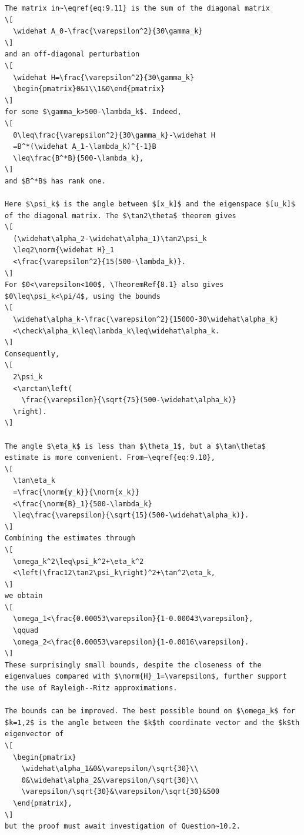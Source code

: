 \begin{verbatim}
The matrix in~\eqref{eq:9.11} is the sum of the diagonal matrix
\[
  \widehat A_0-\frac{\varepsilon^2}{30\gamma_k}
\]
and an off-diagonal perturbation
\[
  \widehat H=\frac{\varepsilon^2}{30\gamma_k}
  \begin{pmatrix}0&1\\1&0\end{pmatrix}
\]
for some $\gamma_k>500-\lambda_k$. Indeed,
\[
  0\leq\frac{\varepsilon^2}{30\gamma_k}-\widehat H
  =B^*(\widehat A_1-\lambda_k)^{-1}B
  \leq\frac{B^*B}{500-\lambda_k},
\]
and $B^*B$ has rank one.

Here $\psi_k$ is the angle between $[x_k]$ and the eigenspace $[u_k]$ of the diagonal matrix. The $\tan2\theta$ theorem gives
\[
  (\widehat\alpha_2-\widehat\alpha_1)\tan2\psi_k
  \leq2\norm{\widehat H}_1
  <\frac{\varepsilon^2}{15(500-\lambda_k)}.
\]
For $0<\varepsilon<100$, \TheoremRef{8.1} also gives $0\leq\psi_k<\pi/4$, using the bounds
\[
  \widehat\alpha_k-\frac{\varepsilon^2}{15000-30\widehat\alpha_k}
  <\check\alpha_k\leq\lambda_k\leq\widehat\alpha_k.
\]
Consequently,
\[
  2\psi_k
  <\arctan\left(
    \frac{\varepsilon}{\sqrt{75}(500-\widehat\alpha_k)}
  \right).
\]

The angle $\eta_k$ is less than $\theta_1$, but a $\tan\theta$ estimate is more convenient. From~\eqref{eq:9.10},
\[
  \tan\eta_k
  =\frac{\norm{y_k}}{\norm{x_k}}
  <\frac{\norm{B}_1}{500-\lambda_k}
  \leq\frac{\varepsilon}{\sqrt{15}(500-\widehat\alpha_k)}.
\]
Combining the estimates through
\[
  \omega_k^2\leq\psi_k^2+\eta_k^2
  <\left(\frac12\tan2\psi_k\right)^2+\tan^2\eta_k,
\]
we obtain
\[
  \omega_1<\frac{0.00053\varepsilon}{1-0.00043\varepsilon},
  \qquad
  \omega_2<\frac{0.00053\varepsilon}{1-0.0016\varepsilon}.
\]
These surprisingly small bounds, despite the closeness of the eigenvalues compared with $\norm{H}_1=\varepsilon$, further support the use of Rayleigh--Ritz approximations.

The bounds can be improved. The best possible bound on $\omega_k$ for $k=1,2$ is the angle between the $k$th coordinate vector and the $k$th eigenvector of
\[
  \begin{pmatrix}
    \widehat\alpha_1&0&\varepsilon/\sqrt{30}\\
    0&\widehat\alpha_2&\varepsilon/\sqrt{30}\\
    \varepsilon/\sqrt{30}&\varepsilon/\sqrt{30}&500
  \end{pmatrix},
\]
but the proof must await investigation of Question~10.2.
\end{verbatim}


